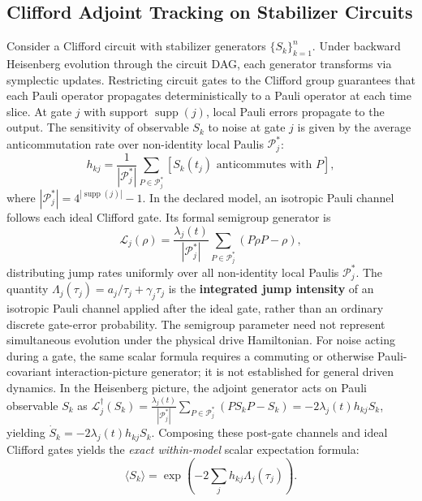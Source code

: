 \documentclass[10pt,letterpaper,journal]{IEEEtran}
\begin{document}
\subsection{Clifford Adjoint Tracking on Stabilizer Circuits}
Consider a Clifford circuit with stabilizer generators $\{S_k\}_{k=1}^n$. Under backward Heisenberg evolution through the circuit DAG, each generator transforms via symplectic updates. Restricting circuit gates to the Clifford group guarantees that each Pauli operator propagates deterministically to a Pauli operator at each time slice. At gate $j$ with support $\operatorname{supp}(j)$, local Pauli errors propagate to the output. The sensitivity of observable $S_k$ to noise at gate $j$ is given by the average anticommutation rate over non-identity local Paulis $\mathcal{P}_j^*$:
\begin{equation}
h_{kj} = \frac{1}{|\mathcal{P}_j^*|} \sum_{P \in \mathcal{P}_j^*} [S_k(t_j) \text{ anticommutes with } P],
\end{equation}
where $|\mathcal{P}_j^*| = 4^{|\operatorname{supp}(j)|} - 1$. In the declared model, an isotropic Pauli channel follows each ideal Clifford gate. Its formal semigroup generator is
\begin{equation}\label{eq:isotropic_generator}
\mathcal{L}_j(\rho) = \frac{\lambda_j(t)}{|\mathcal{P}_j^*|} \sum_{P \in \mathcal{P}_j^*} (P \rho P - \rho),
\end{equation}
distributing jump rates uniformly over all non-identity local Paulis $\mathcal{P}_j^*$. The quantity $\Lambda_j(\tau_j) = a_j/\tau_j + \gamma_j \tau_j$ is the \textbf{integrated jump intensity} of an isotropic Pauli channel applied after the ideal gate, rather than an ordinary discrete gate-error probability. The semigroup parameter need not represent simultaneous evolution under the physical drive Hamiltonian. For noise acting during a gate, the same scalar formula requires a commuting or otherwise Pauli-covariant interaction-picture generator; it is not established for general driven dynamics. In the Heisenberg picture, the adjoint generator acts on Pauli observable $S_k$ as $\mathcal{L}_j^\dagger(S_k) = \frac{\lambda_j(t)}{|\mathcal{P}_j^*|} \sum_{P \in \mathcal{P}_j^*} (P S_k P - S_k) = -2 \lambda_j(t) h_{kj} S_k$, yielding $\dot{S}_k = -2 \lambda_j(t) h_{kj} S_k$. Composing these post-gate channels and ideal Clifford gates yields the \emph{exact within-model} scalar expectation formula:
\begin{equation}\label{eq:observable_expectation}
\langle S_k \rangle = \exp\left( -2 \sum_j h_{kj} \Lambda_j(\tau_j) \right).
\end{equation}
\end{document}
